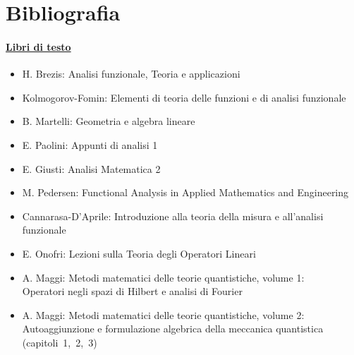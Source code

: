 \documentclass[a4paper,12pt]{report}
\begin{document}
\newpage
{}
\chapter*{Bibliografia}

\subsubsection{\underline{Libri di testo}}

\begin{itemize}
    \item H. Brezis: Analisi funzionale, Teoria e applicazioni
    \item Kolmogorov-Fomin: Elementi di teoria delle funzioni e di analisi funzionale
    \item B. Martelli: Geometria e algebra lineare
    \item E. Paolini: Appunti di analisi 1
    \item E. Giusti: Analisi Matematica 2
    \item M. Pedersen: Functional Analysis in Applied Mathematics and Engineering
    \item Cannarasa-D'Aprile: Introduzione alla teoria della misura e all'analisi funzionale
    \item E. Onofri: Lezioni sulla Teoria degli Operatori Lineari
    \item A. Maggi: Metodi matematici delle teorie quantistiche, volume 1: 
    \\Operatori negli spazi di Hilbert e analisi di Fourier
    \item A. Maggi: Metodi matematici delle teorie quantistiche, volume 2: 
    \\Autoaggiunzione e formulazione algebrica della meccanica quantistica \mbox{(capitoli 1, 2, 3)}
\end{itemize}
\end{document}
